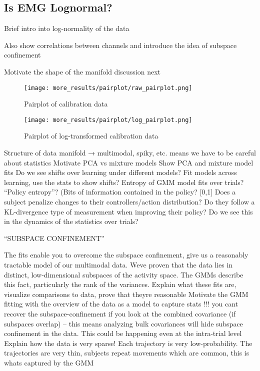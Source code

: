 \documentclass[../main.tex]{subfiles}
\begin{document}
\subsection{Is EMG Lognormal?}

Brief intro into log-normality of the data

Also show correlations between channels and introduce the idea of subspace confinement

Motivate the shape of the manifold discussion next

\begin{figure}[tph]
    \centering
    \texttt{[image: more\_results/pairplot/raw\_pairplot.png]}
    \caption[Pairplot of calibration data]{Pairplot of calibration data}\label{fig:raw_pairplot}
\end{figure}

\begin{figure}[tph]
    \centering
    \texttt{[image: more\_results/pairplot/log\_pairplot.png]}
    \caption[Pairplot of log-transformed calibration data]{Pairplot of log-transformed calibration data}\label{fig:log_pairplot}
\end{figure}




Structure of data manifold → multimodal, spiky, etc. means we have to be careful about statistics
	Motivate PCA vs mixture models
	Show PCA and mixture model fits
Do we see shifts over learning under different models?
	Fit models across learning, use the stats to show shifts?
Entropy of GMM model fits over trials? “Policy entropy”? (Bits of information contained in the policy? [0,1] %
Does a subject penalize changes to their controllers/action distribution? Do they follow a KL-divergence type of measurement when improving their policy? Do we see this in the dynamics of the statistics over trials?

``SUBSPACE CONFINEMENT''

The fits enable you to overcome the subspace confinement, give us a reasonably tractable model of our multimodal data. Weve proven that the data lies in distinct, low-dimensional subspaces of the activity space. The GMMs describe this fact, particularly the rank of the variances.	
Explain what these fits are, visualize comparisons to data, prove that theyre reasonable
Motivate the GMM fitting with the overview of the data as a model to capture stats
!!! you cant recover the subspace-confinement if you look at the combined covariance (if subspaces overlap) – this means analyzing bulk covariances will hide subspace confinement in the data. This could be happening even at the intra-trial level
Explain how the data is very sparse! Each trajectory is very low-probability. The trajectories are very thin, subjects repeat movements which are common, this is whats captured by the GMM
\end{document}
